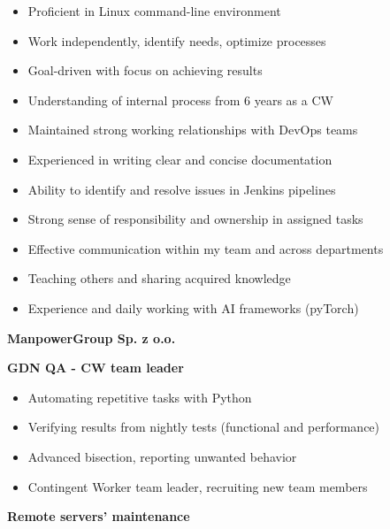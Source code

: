 \documentclass[10pt,a4paper,ragged2e,withhyper]{altacv}
\begin{document}
\begin{paracol}{2}


\begin{itemize}
\item Proficient in Linux command-line environment
\item Work independently, identify needs, optimize processes
\item Goal-driven with focus on achieving results
\item Understanding of internal process from 6 years as a CW
\item Maintained strong working relationships with DevOps teams
\item Experienced in writing clear and concise documentation
\item Ability to identify and resolve issues in Jenkins pipelines
\item Strong sense of responsibility and ownership in assigned tasks
\item Effective communication within my team and across departments
\item Teaching others and sharing acquired knowledge
\item Experience and daily working with AI frameworks (pyTorch)
\end{itemize}


\large\textbf{ManpowerGroup Sp. z o.o.} \normalsize

\medskip

\textbf{\textcolor{accent}{GDN QA - CW team leader}} \hfill {}

\smallskip

\begin{itemize}
\item Automating repetitive tasks with Python
\item Verifying results from nightly tests (functional and performance)
\item Advanced bisection, reporting unwanted behavior
\item Contingent Worker team leader, recruiting new team members
\end{itemize}

\medskip

\textbf{\textcolor{accent}{Remote servers’ maintenance}} \hfill {}
\smallskip


\end{paracol}
\end{document}
